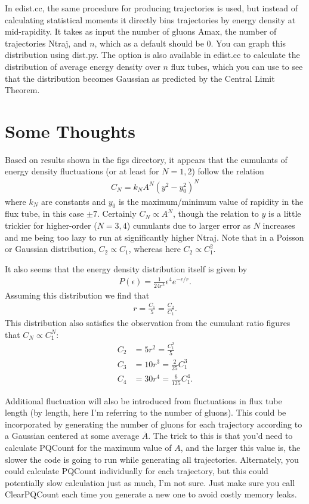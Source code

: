 \documentclass{article}
\begin{document}
In edist.cc, the same procedure for producing trajectories is used, but instead of calculating statistical moments it directly bins trajectories by energy density at mid-rapidity. It takes as input the number of gluons Amax, the number of trajectories Ntraj, and $n$, which as a default should be 0. You can graph this distribution using dist.py. The option is also available in edist.cc to calculate the distribution of average energy density over $n$ flux tubes, which you can use to see that the distribution becomes Gaussian as predicted by the Central Limit Theorem.

\section*{Some Thoughts}
Based on results shown in the figs directory, it appears that the cumulants of energy density fluctuations (or at least for $N=1,2$) follow the relation
\begin{align*}
C_N = k_N A^N (y^2 - y_0^2)^N
\end{align*}
where $k_N$ are constants and $y_0$ is the maximum/minimum value of rapidity in the flux tube, in this case $\pm 7$. Certainly $C_N \propto A^N$, though the relation to $y$ is a little trickier for higher-order ($N=3,4$) cumulants due to larger error as $N$ increases and me being too lazy to run at significantly higher Ntraj. Note that in a Poisson or Gaussian distribution, $C_2 \propto C_1$, whereas here $C_2 \propto C_1^2$. 

It also seems that the energy density distribution itself is given by
\begin{align*}
P(\epsilon)=\frac{1}{24r^5} \epsilon^4 e^{-\epsilon/r}.
\end{align*}
Assuming this distribution we find that
\begin{align*}
r=\frac{C_1}{5}=\frac{C_2}{C_1}.
\end{align*}
This distribution also satisfies the observation from the cumulant ratio figures that $C_N \propto C_1^N$:
\begin{align*}
C_2 &= 5 r^2=\frac{C_1^2}{5} \\
C_3 &= 10 r^3=\frac{2}{25}C_1^3 \\
C_4 &= 30 r^4=\frac{6}{125}C_1^4.
\end{align*}

Additional fluctuation will also be introduced from fluctuations in flux tube length (by length, here I'm referring to the number of gluons). This could be incorporated by generating the number of gluons for each trajectory according to a Gaussian centered at some average $\overline{A}$. The trick to this is that you'd need to calculate PQCount for the maximum value of $A$, and the larger this value is, the slower the code is going to run while generating all trajectories. Alternately, you could calculate PQCount individually for each trajectory, but this could potentially slow calculation just as much, I'm not sure. Just make sure you call ClearPQCount each time you generate a new one to avoid costly memory leaks.
\end{document}
